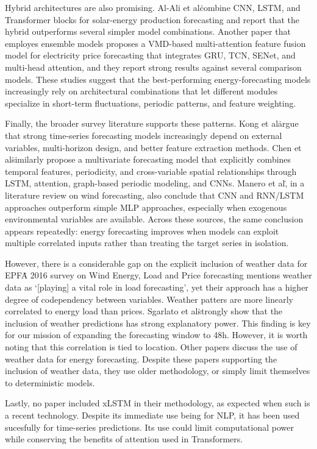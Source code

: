 Hybrid architectures are also promising. Al-Ali et al\. combine CNN, LSTM, and Transformer blocks for solar-energy production forecasting and report that the hybrid outperforms several simpler model combinations\cite{math11030676}. Another paper that employes ensemble models proposes a VMD-based multi-attention feature fusion model for electricity price forecasting that integrates GRU, TCN, SENet, and multi-head attention, and they report strong results against several comparison models\cite{Xu2025}. These studies suggest that the best-performing energy-forecasting models increasingly rely on architectural combinations that let different modules specialize in short-term fluctuations, periodic patterns, and feature weighting.

Finally, the broader survey literature supports these patterns. Kong et al\. argue that strong time-series forecasting models increasingly depend on external variables, multi-horizon design, and better feature extraction methods\cite{Kong2025}. Chen et al\. similarly propose a multivariate forecasting model that explicitly combines temporal features, periodicity, and cross-variable spatial relationships through LSTM, attention, graph-based periodic modeling, and CNNs\cite{CHEN2025126302}. Manero et al\., in a literature review on wind forecasting, also conclude that CNN and RNN/LSTM approaches outperform simple MLP approaches, especially when exogenous environmental variables are available\cite{Manero2018}. Across these sources, the same conclusion appears repeatedly: energy forecasting improves when models can exploit multiple correlated inputs rather than treating the target series in isolation. 

However, there is a considerable gap on the explicit inclusion of weather data for EPF\. A 2016 survey on Wind Energy, Load and Price forecasting mentions weather data as `[playing] a vital role in load forecasting', yet their approach has a higher degree of codependency between variables\cite{7754792}.
Weather patters are more linearly correlated to energy load than prices. Sgarlato et al\. strongly show that the inclusion of weather predictions has strong explanatory power\cite{9788043}. This finding is key
for our mission of expanding the forecasting window to 48h. However, it is worth noting that this correlation is tied to location. Other papers discuss the use of weather data for energy forecasting\cite{7903735,Brecl2018-zt}. Despite these papers supporting the inclusion of weather data,
they use older methodology, or simply limit themselves to deterministic models.

Lastly, no paper included xLSTM\cite{xLSTM2024} in their methodology, as expected when such is a recent technology. Despite its immediate use being for NLP, it has been used sucesfully for time-series predictions\cite{xLSTMTimeSeries2025,xLSTMMixer}. Its use could limit computational power while conserving the benefits of attention
used in Transformers.